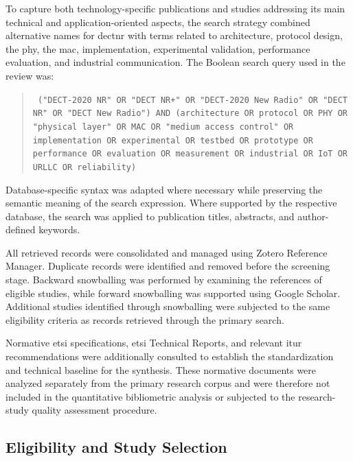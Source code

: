 To capture both technology-specific publications and studies addressing its main technical and application-oriented aspects, the search strategy combined alternative names for \gls{dectnr} with terms related to architecture, protocol design, the \gls{phy}, the \gls{mac}, implementation, experimental validation, performance evaluation, and industrial communication. The Boolean search query used in the review was:

\begin{quote} \small \texttt{ ("DECT-2020 NR" OR "DECT NR+" OR "DECT-2020 New Radio" OR "DECT NR" OR "DECT New Radio") AND (architecture OR protocol OR PHY OR "physical layer" OR MAC OR "medium access control" OR implementation OR experimental OR testbed OR prototype OR performance OR evaluation OR measurement OR industrial OR IoT OR URLLC OR reliability) }
\end{quote}

Database-specific syntax was adapted where necessary while preserving the semantic meaning of the search expression. Where supported by the respective database, the search was applied to publication titles, abstracts, and author-defined keywords.

All retrieved records were consolidated and managed using Zotero Reference Manager. Duplicate records were identified and removed before the screening stage. Backward snowballing was performed by examining the references of eligible studies, while forward snowballing was supported using Google Scholar. Additional studies identified through snowballing were subjected to the same eligibility criteria as records retrieved through the primary search.

Normative \gls{etsi} specifications, \gls{etsi} Technical Reports, and relevant \gls{itur} recommendations were additionally consulted to establish the standardization and technical baseline for the synthesis. These normative documents were analyzed separately from the primary research corpus and were therefore not included in the quantitative bibliometric analysis or subjected to the research-study quality assessment procedure.

\subsection{Eligibility and Study Selection}
\label{subsec:eligibility}

